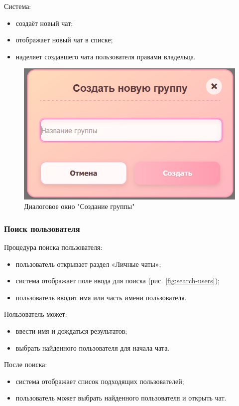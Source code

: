 Система:

\begin{itemize}		
\item создаёт новый чат;  
\item отображает новый чат в списке;
\item наделяет создавшего чата пользователя правами владельца.
\end{itemize}

\begin{figure}[H]
	\centering
	\includegraphics[width=0.8\linewidth]{"images/Окно создания группы"}
	\caption{Диалоговое окно "Создание группы"}
	\label{fig:create-group}
\end{figure}

\subsubsection{Поиск пользователя}  
Процедура поиска пользователя:
\begin{itemize}
	\item пользователь открывает раздел «Личные чаты»;
	\item система отображает поле ввода для поиска (рис. \ref{fig:search-users});
	\item пользователь вводит имя или часть имени пользователя.
\end{itemize}

Пользователь может:
\begin{itemize}
	\item ввести имя и дождаться результатов;
	\item выбрать найденного пользователя для начала чата.
\end{itemize}

После поиска:
\begin{itemize}
	\item система отображает список подходящих пользователей;
	\item пользователь может выбрать найденного пользователя и открыть чат.
\end{itemize}

